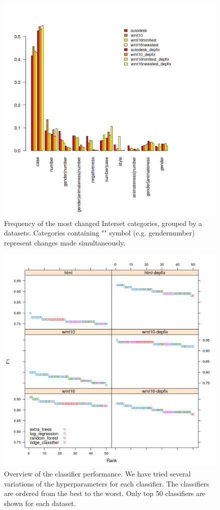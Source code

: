 \begin{figure}
\centering
  \includegraphics[scale=0.7]{iset}
  \caption{
    Frequency of the most changed Interset categories, grouped by a datasets. Categories containing
    "\textbar" symbol (e.g. gender\textbar{}number) represent changes made simultaneously.
}
  \label{iset-barplot}
\end{figure}

\begin{figure}
\centering
  \includegraphics[scale=0.7]{cat-class}
  \caption{
    Overview of the classifier performance.
We have tried several variations of the hyperparameters
for each classifier. The classifiers are ordered from the best to the worst. Only top 50 classifiers
are shown for each dataset.
}
  \label{cats-draft}
\end{figure}

